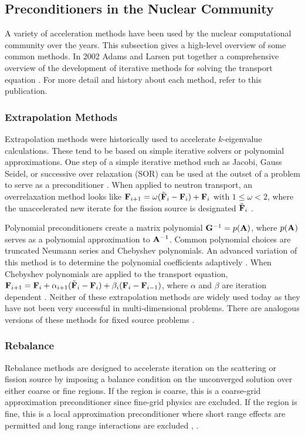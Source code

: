 \subsection{Preconditioners in the Nuclear Community}
A variety of acceleration methods have been used by the nuclear computational community over the years. This subsection gives a high-level overview of some common methods. In 2002 Adams and Larsen put together a comprehensive overview of the development of iterative methods for solving the \Sn transport equation \cite{Adams2002}. For more detail and history about each method, refer to this publication. 

\subsubsection{Extrapolation Methods}
Extrapolation methods were historically used to accelerate $k$-eigenvalue calculations. These tend to be based on simple iterative solvers or polynomial approximations. One step of a simple iterative method such as Jacobi, Gauss Seidel, or successive over relaxation (SOR) can be used at the outset of a problem to serve as a preconditioner \cite{Trefethen1997}. When applied to neutron transport, an overrelaxation method looks like $\mathbf{F}_{i+1} = \omega(\tilde{\mathbf{F}}_i - \mathbf{F}_i) + \mathbf{F}_i$ with $1 \le \omega < 2$, where the unaccelerated new iterate for the fission source is designated $\tilde{\mathbf{F}}_i$ \cite{Lewis1993}.

Polynomial preconditioners create a matrix polynomial $\mathbf{G}^{-1} = p(\mathbf{A})$, where $p(\mathbf{A})$ serves as a polynomial approximation to $\mathbf{A}^{-1}$. Common polynomial choices are truncated Neumann series and Chebyshev polynomials. An advanced variation of this method is to determine the polynomial coefficients adaptively \cite{Trefethen1997}. When Chebyshev polynomials are applied to the transport equation, $\mathbf{F}_{i+1} = \mathbf{F}_i + \alpha_{i+1}(\tilde{\mathbf{F}}_i - \mathbf{F}_i) + \beta_i(\mathbf{F}_i - \mathbf{F}_{i-1})$, where $\alpha$ and $\beta$ are iteration dependent \cite{Lewis1993}. Neither of these extrapolation methods are widely used today as they have not been very successful in multi-dimensional problems. There are analogous versions of these methods for fixed source problems \cite{Alcouffe1977}.  

\subsubsection{Rebalance}
Rebalance methods are designed to accelerate iteration on the scattering or fission source by imposing a balance condition on the unconverged solution over either coarse or fine regions. If the region is coarse, this is a coarse-grid approximation preconditioner since fine-grid physics are excluded. If the region is fine, this is a local approximation preconditioner where short range effects are permitted and long range interactions are excluded \cite{Trefethen1997}, \cite{Adams2002}.

